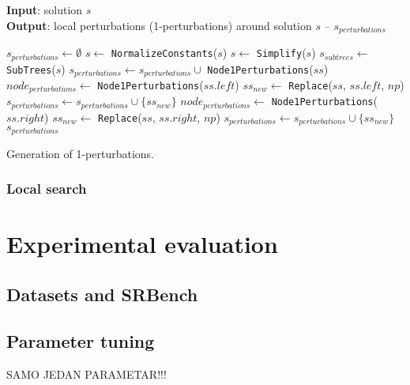 \documentclass[a4paper,12pt]{elsarticle}
\begin{document}
\begin{algorithm}
	\hspace*{\algorithmicindent} \textbf{Input}: solution $s$ \\
	\hspace*{\algorithmicindent} \textbf{Output}: local perturbations (1-perturbations) around solution $s$ -- $s_{perturbations}$
	\begin{algorithmic}[1] 
		\State $s_{perturbations} \gets \emptyset$
		\State $s \gets$ \texttt{NormalizeConstants}($s$)
		\State $s \gets$ \texttt{Simplify}($s$)
		\State $s_{subtrees} \gets$ \texttt{SubTrees}($s$)
				\State $s_{perturbations} \gets s_{perturbations} \cup$ \texttt{Node1Perturbations}($ss$)
			\EndIf
				\State $node_{perturbations} \gets$ \texttt{Node1Perturbations}($ss.left$)
					\State $ss_{new} \gets$ \texttt{Replace}($ss$, $ss.left$, $np$)
					\State $s_{perturbations} \gets s_{perturbations} \cup \{ss_{new}\}$
				\EndFor
			\EndIf
				\State $node_{perturbations} \gets$ \texttt{Node1Perturbations}($ss.right$)
					\State $ss_{new} \gets$ \texttt{Replace}($ss$, $ss.right$, $np$)
					\State $s_{perturbations} \gets s_{perturbations} \cup \{ss_{new}\}$
				\EndFor
			\EndIf
		\EndFor
		\State \Return $s_{perturbations}$
		\EndProcedure
	\end{algorithmic}
	\caption{Generation of 1-perturbations.}
	\label{alg:pert}
\end{algorithm}  

\subsubsection{Local search}\label{sec:ls}
   
\section{Experimental evaluation}\label{sec:experiments}

\subsection{Datasets and SRBench}

\subsection{Parameter tuning}
SAMO JEDAN PARAMETAR!!!
\end{document}
